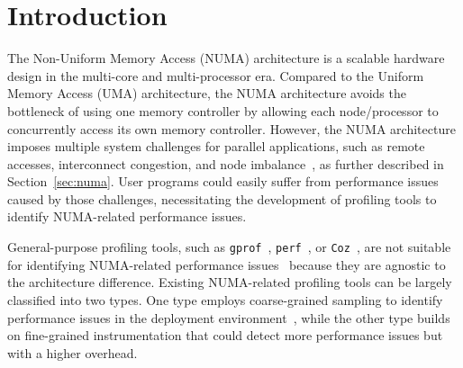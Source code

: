 \section{Introduction}
\label{sec:intro}

The Non-Uniform Memory Access (NUMA) architecture is a scalable hardware design in the multi-core and multi-processor era. Compared to the Uniform Memory Access (UMA) architecture, the NUMA architecture avoids the bottleneck of using one memory controller by allowing each node/processor to concurrently access its own memory controller. However, the NUMA architecture imposes multiple system challenges for parallel applications, such as remote accesses, interconnect congestion, and node imbalance~\cite{Blagodurov:2011:CNC:2002181.2002182}, as further described in Section~\ref{sec:numa}. User programs could easily suffer from performance issues caused by those challenges, necessitating the development of profiling tools to identify NUMA-related performance issues. 

General-purpose profiling tools, such as \texttt{gprof}~\cite{DBLP:conf/sigplan/GrahamKM82}, \texttt{perf}~\cite{perf}, or \texttt{Coz}~\cite{Coz}, are not suitable for identifying NUMA-related performance issues~\cite{XuNuma, NumaPerf} because they are agnostic to the architecture difference. 
Existing NUMA-related profiling tools can be largely classified into two types. One type employs coarse-grained sampling to identify performance issues in the deployment environment~\cite{XuNuma}, while the other type builds on fine-grained instrumentation that could detect more performance issues but with a higher overhead. 



